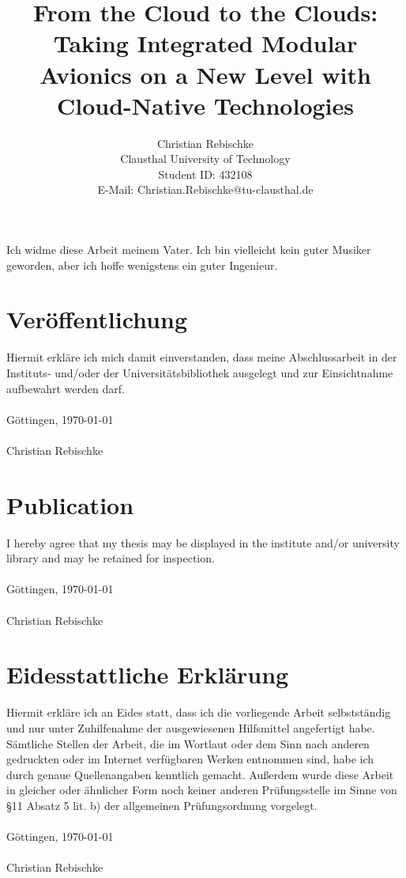 \documentclass[titlepage]{report}
\title{From the Cloud to the Clouds: Taking Integrated Modular Avionics on a New Level with Cloud-Native Technologies}
\author{Christian Rebischke\\
Clausthal University of Technology\\
Student ID: 432108 \\
E-Mail: Christian.Rebischke@tu-clausthal.de}
\begin{document}
\maketitle
{}
\chapter*{}
\vspace*{25mm}
\begin{center}
Ich widme diese Arbeit meinem Vater. Ich bin vielleicht kein guter Musiker geworden, aber ich hoffe wenigstens ein guter Ingenieur.
\end{center}
\vspace*{25mm}

\chapter*{Veröffentlichung}
Hiermit erkläre ich mich damit einverstanden, dass meine Abschlussarbeit in der Instituts- und/oder der Universitätsbibliothek ausgelegt und zur
Einsichtnahme aufbewahrt werden darf.
\\
\\
Göttingen, \today
\\
\\
Christian Rebischke

\chapter*{Publication}
I hereby agree that my thesis may be displayed in the institute and/or university library and
may be retained for inspection.
\\
\\
Göttingen, \today
\\
\\
Christian Rebischke

\chapter*{Eidesstattliche Erklärung}
Hiermit erkläre ich an Eides statt, dass ich die vorliegende Arbeit selbstständig und nur unter Zuhilfenahme der ausgewiesenen Hilfsmittel angefertigt habe.
Sämtliche Stellen der Arbeit, die im Wortlaut oder dem Sinn nach anderen gedruckten oder im Internet verfügbaren Werken entnommen sind, habe ich durch
genaue Quellenangaben kenntlich gemacht. Außerdem wurde diese Arbeit in gleicher oder ähnlicher Form noch keiner anderen Prüfungsstelle im Sinne von
\S11 Absatz 5 lit. b) der allgemeinen Prüfungsordnung vorgelegt.
\\
\\
Göttingen, \today
\\
\\
Christian Rebischke
\end{document}

